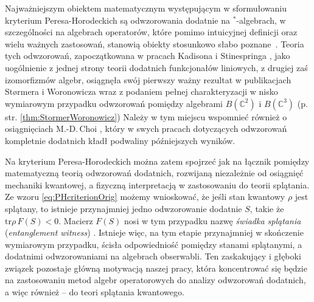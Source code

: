Najważniejszym obiektem matematycznym występującym w sformułowaniu
kryterium Peresa-Horodeckich są odwzorowania dodatnie na $^{*}$-algebrach,
w szczególności na algebrach operatorów,
które pomimo intuicyjnej definicji oraz wielu ważnych zastosowań,
stanowią obiekty stosunkowo słabo 
\mbox{poznane \cite{Stormer2013}}.
Teoria tych odwzorowań, zapoczątkowana w pracach
Kadisona \cite{kadison1952generalized}
i Stinespringa
\cite{stinespring1955positive},
jako uogólnienie z jednej strony teorii dodatnich funkcjonałów liniowych,
z drugiej zaś izomorfizmów algebr,
osiągnęła swój pierwszy ważny rezultat w publikacjach Størmera i Woronowicza
\cite{stormer1963positive,woronowicz1976positive}
wraz z podaniem pełnej charakteryzacji w nisko wymiarowym przypadku
odwzorowań pomiędzy algebrami $B(\mathbb{C}^{2})$ i $B(\mathbb{C}^{3})$
(p. str. \ref{thm:StormerWoronowicz})
Należy w tym miejscu wspomnieć również o osiągnięciach M.-D.\,Choi
\cite{choi1975positive,choi1975completely,choi1977extremal},
który w swych pracach dotyczących odwzorowań kompletnie dodatnich
kładł podwaliny późniejszych wyników.

Na kryterium Peresa-Horodeckich można zatem spojrzeć jak na łącznik pomiędzy
matematyczną teorią odwzorowań dodatnich,
rozwijaną niezależnie od osiągnięć mechaniki kwantowej,
a fizyczną interpretacją w zastosowaniu do teorii splątania.
Ze wzoru \eqref{eq:PHcriterionOrig} możemy wnioskować,
że jeśli stan kwantowy $\rho$ jest splątany,
to istnieje przynajmniej jedno odwzorowanie dodatnie $S$,
takie że $\text{tr} \rho \, F(S) < 0$.
Macierz $F(S)$ nosi w tym przypadku nazwę
\emph{świadka splątania} (\emph{entanglement witness})
\cite{bourennane2004experimental}.
Istnieje więc,
na tym etapie przynajmniej w skończenie wymiarowym przypadku,
ścisła odpowiedniość pomiędzy stanami splątanymi,
a dodatnimi odwzorowaniami na algebrach obserwabli.
Ten zaskakujący i głęboki związek pozostaje główną motywacją naszej pracy,
która koncentrować się będzie na zastosowaniu metod algebr operatorowych
do analizy odwzorowań dodatnich,
a więc również -- do teori splątania kwantowego.

